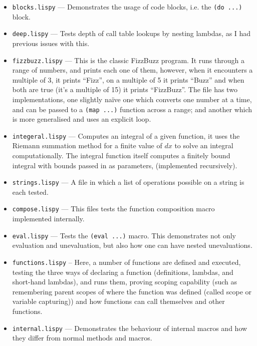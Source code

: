 \documentclass{article}
\newcommand{\code}[1]{\texttt{#1}}
\begin{document}
    \begin{itemize}
      \item \code{blocks.lispy} --- Demonstrates the usage of code blocks, i.e.
      the \code{(do ...)} block.
      \item \code{deep.lispy} --- Tests depth of call table lookups by nesting
      lambdas, as I had previous issues with this.
      \item \code{fizzbuzz.lispy} --- This is the classic FizzBuzz program.
      It runs through a range of numbers, and prints each one of them, however,
      when it encounters a multiple of 3, it prints ``Fizz'', on a multiple of
      5 it prints ``Buzz'' and when both are true (it's a multiple of 15)
      it prints ``FizzBuzz''. The file has two implementations, one slightly na\"ive one
      which converts one number at a time, and can be passed to a \code{(map ...)}
      function across a range; and another which is more generalised and uses
      an explicit loop.
      \item \code{integeral.lispy} --- Computes an integral of a given function,
      it uses the Riemann summation method for a finite value of $dx$ to solve
      an integral computationally. The integral function itself computes a
      finitely bound integral with bounds passed in as parameters, (implemented recursively).
      \item \code{strings.lispy} --- A file in which a list of operations possible on
      a string is each tested.
      \item \code{compose.lispy} --- This files tests the function composition macro
      implemented internally.
      \item \code{eval.lispy} --- Tests the \code{(eval ...)} macro. This demonstrates
      not only evaluation and unevaluation, but also how one can have nested unevaluations.
      \item \code{functions.lispy} -- Here, a number of functions are defined
      and executed, testing the three ways of declaring a function (definitions,
      lambdas, and short-hand lambdas), and runs them, proving scoping capability
      (such as remembering parent scopes of where the function was defined (called
      scope or variable capturing)) and how functions can call themselves and other functions.
      \item \code{internal.lispy} --- Demonstrates the behaviour of internal
      macros and how they differ from normal methods and macros.
    \end{itemize}
\end{document}
